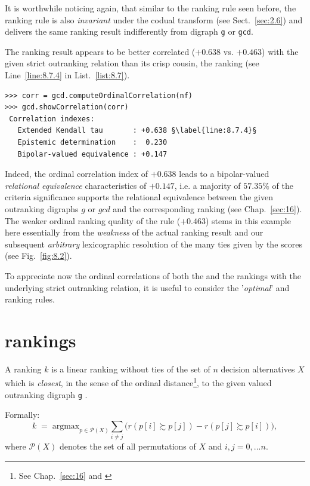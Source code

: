 It is worthwhile noticing again, that similar to the \Copeland ranking rule seen before, the \NetFlows ranking rule is also \emph{invariant} under the codual transform (see Sect.~\ref{sec:2.6}) and delivers the same ranking result indifferently from digraph \texttt{g} or \texttt{gcd}. 

The \NetFlows ranking result appears to be better correlated ($+0.638$ vs. $+0.463$) with the given strict outranking relation than its crisp cousin, the \Copeland ranking (see Line~\ref{line:8.7.4} in List.~\vref{list:8.7}).
\begin{lstlisting}[caption={Checking the quality of the \NetFlows Ranking},label=list:8.7]   
>>> corr = gcd.computeOrdinalCorrelation(nf)
>>> gcd.showCorrelation(corr)
 Correlation indexes:
   Extended Kendall tau       : +0.638 §\label{line:8.7.4}§
   Epistemic determination    :  0.230
   Bipolar-valued equivalence : +0.147
\end{lstlisting}

Indeed, the ordinal correlation index of $+0.638$ leads to a bipolar-valued \emph{relational equivalence} characteristics of $+0.147$, i.e. a majority of $57.35\%$ of the criteria significance supports the relational equivalence between the given outranking digraphs $g$ or $gcd$  and the corresponding \NetFlows ranking (see Chap.~\ref{sec:16}). The weaker ordinal ranking quality of the \Copeland rule ($+0.463$) stems in this example here essentially from the \emph{weakness} of the actual \Copeland ranking result and our subsequent \emph{arbitrary} lexicographic resolution of the many ties given by the \Copeland scores (see Fig.~\vref{fig:8.2}).

To appreciate now the ordinal correlations of both the \Copeland and the \NetFlows rankings with the underlying strict outranking relation, it is useful to consider the '\emph{optimal}' \Kemeny and \Slater ranking rules.

\section{\Kemeny rankings}
\label{sec:8.4}

A \Kemeny ranking $k$ is a linear ranking without ties of the set of $n$ decision alternatives $X$ which is \emph{closest}, in the sense of the ordinal \Kendall distance\footnote{See Chap.~\ref{sec:16} and \citealp{BIS-2012a}}, to the given valued outranking digraph \texttt{g}  \citep{KEM-1959}.

Formally:
\begin{equation}\label{eq:8.1}
    k \;=\; \text{argmax}_{p \in \mathcal{P}(X)} \sum_{i \neq j}\big(r(p[i] \succsim p[j]) - r(p[j] \succsim p[i]) \big),
\end{equation}
where $\mathcal{P}(X)$ denotes the set of all permutations of $X$ and $i,j = 0,... n$.

